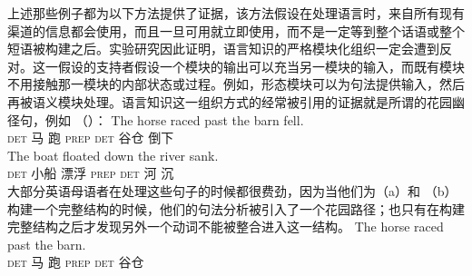 上述那些例子都为以下方法提供了证据，该方法假设在处理语言时，来自所有现有渠道的信息都会使用，而且一旦可用就立即使用，而不是一定等到整个话语或整个短语被构建之后。实验研究因此证明，语言知识的严格模块化组织一定会遭到反对。这一假设的支持者假设一个模块的输出可以充当另一模块的输入，而既有模块不用接触那一模块的内部状态或过程。例如，形态模块可以为句法提供输入，然后再被语义模块处理。语言知识这一组织方式的经常被引用的证据就是所谓的花园幽径句，例如 （）：
\eal
\ex\label{bsp-horse-past-barn} 
\gll The horse raced past the barn fell.\\
    \textsc{det} 马 跑 \textsc{prep} \textsc{det} 谷仓 倒下\\
\ex 
\gll The boat floated down the river sank.\\
    \textsc{det} 小船 漂浮 \textsc{prep} \textsc{det} 河 沉\\
\zl
大部分英语母语者在处理这些句子的时候都很费劲，因为当他们为（a）和 （b）构建一个完整结构的时候，他们的句法分析被引入了一个花园路径；也只有在构建完整结构之后才发现另外一个动词不能被整合进入这一结构。
\eal
\ex 
\gll The horse raced past the barn.\\
    \textsc{det} 马 跑 \textsc{prep} \textsc{det} 谷仓\\
